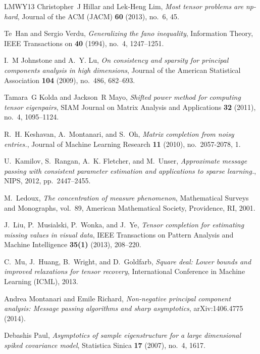 \documentclass[11pt]{article}
\theoremstyle{definition}
\begin{document}
\begin{thebibliography}{LMWY13}
Christopher~J Hillar and Lek-Heng Lim, \emph{Most tensor problems are np-hard},
  Journal of the ACM (JACM) \textbf{60} (2013), no.~6, 45.

Te~Han and Sergio Verdu, \emph{Generalizing the fano inequality}, Information
  Theory, IEEE Transactions on \textbf{40} (1994), no.~4, 1247--1251.

I.~M Johnstone and A.~Y. Lu, \emph{On consistency and sparsity for principal
  components analysis in high dimensions}, Journal of the American Statistical
  Association \textbf{104} (2009), no.~486, 682--693.

Tamara~G Kolda and Jackson~R Mayo, \emph{Shifted power method for computing
  tensor eigenpairs}, SIAM Journal on Matrix Analysis and Applications
  \textbf{32} (2011), no.~4, 1095--1124.

R.~H. Keshavan, A.~Montanari, and S.~Oh, \emph{Matrix completion from noisy
  entries.}, Journal of Machine Learning Research \textbf{11} (2010),
  no.~2057-2078, 1.

U.~Kamilov, S.~Rangan, A.~K. Fletcher, and M.~Unser, \emph{Approximate message
  passing with consistent parameter estimation and applications to sparse
  learning.}, NIPS, 2012, pp.~2447--2455.

M.~Ledoux, \emph{{The concentration of measure phenomenon}}, Mathematical
  Surveys and Monographs, vol.~89, {American Mathematical Society, Providence,
  RI}, 2001.

J.~Liu, P.~Musialski, P.~Wonka, and J.~Ye, \emph{Tensor completion for
  estimating missing values in visual data}, IEEE Transactions on Pattern
  Analysis and Machine Intelligence \textbf{35(1)} (2013), 208--220.

C.~Mu, J.~Huang, B.~Wright, and D.~Goldfarb, \emph{Square deal: Lower bounds
  and improved relaxations for tensor recovery}, International Conference in
  Machine Learning (ICML), 2013.

Andrea Montanari and Emile Richard, \emph{Non-negative principal component
  analysis: Message passing algorithms and sharp asymptotics}, {\sf
  arXiv:1406.4775} (2014).

Debashis Paul, \emph{Asymptotics of sample eigenstructure for a large
  dimensional spiked covariance model}, Statistica Sinica \textbf{17} (2007),
  no.~4, 1617.


\end{thebibliography}
\end{document}
